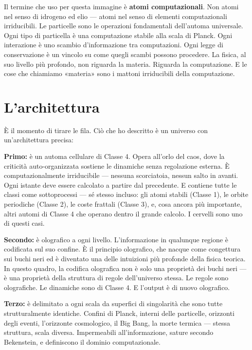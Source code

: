 \documentclass[11pt, twoside, openright]{book}
\begin{document}
Il termine che uso per questa immagine è \textbf{atomi computazionali}. Non atomi nel senso di idrogeno ed elio --- atomi nel senso di elementi computazionali irriducibili. Le particelle sono le operazioni fondamentali dell'automa universale. Ogni tipo di particella è una computazione stabile alla scala di Planck. Ogni interazione è uno scambio d'informazione tra computazioni. Ogni legge di conservazione è un vincolo su come quegli scambi possono procedere. La fisica, al suo livello più profondo, non riguarda la materia. Riguarda la computazione. E le cose che chiamiamo «materia» sono i mattoni irriducibili della computazione.


\section*{L'architettura}

È il momento di tirare le fila. Ciò che ho descritto è un universo con un'architettura precisa:

\textbf{Primo:} è un automa cellulare di Classe 4. Opera all'orlo del caos, dove la criticità auto-organizzata sostiene le dinamiche senza regolazione esterna. È computazionalmente irriducibile --- nessuna scorciatoia, nessun salto in avanti. Ogni istante deve essere calcolato a partire dal precedente. E contiene tutte le classi come sottoprocessi --- sé stesso incluso: gli atomi stabili (Classe 1), le orbite periodiche (Classe 2), le coste frattali (Classe 3), e, cosa ancora più importante, altri automi di Classe 4 che operano dentro il grande calcolo. I cervelli sono uno di questi casi.

\textbf{Secondo:} è olografico a ogni livello. L'informazione in qualunque regione è codificata sul suo confine. È il principio olografico, che nacque come congettura sui buchi neri ed è diventato una delle intuizioni più profonde della fisica teorica. In questo quadro, la codifica olografica non è solo una proprietà dei buchi neri --- è una proprietà della struttura di regole dell'universo stessa. Le regole sono olografiche. Le dinamiche sono di Classe 4. E l'output è di nuovo olografico.

\textbf{Terzo:} è delimitato a ogni scala da superfici di singolarità che sono tutte strutturalmente identiche. Confini di Planck, interni delle particelle, orizzonti degli eventi, l'orizzonte cosmologico, il Big Bang, la morte termica --- stessa struttura, scala diversa. Impermeabili all'informazione, sature secondo Bekenstein, e definiscono il dominio computazionale.
\end{document}
